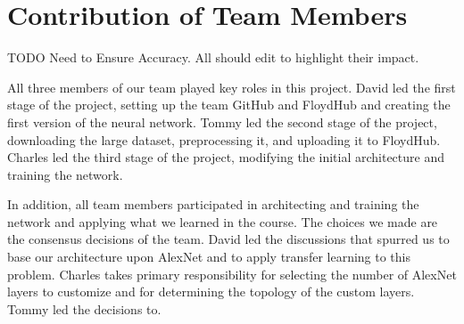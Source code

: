 \section{Contribution of Team Members}

TODO Need to Ensure Accuracy. All should edit to highlight their impact.

All three members of our team played key roles in this project. David led the first stage of the project, setting up the team GitHub and FloydHub and creating the first version of the neural network. Tommy led the second stage of the project, downloading the large dataset, preprocessing it, and uploading it to FloydHub. Charles led the third stage of the project, modifying the initial architecture and training the network.

In addition, all team members participated in architecting and training the network and applying what we learned in the course. The choices we made are the consensus decisions of the team. David led the discussions that spurred us to base our architecture upon AlexNet and to apply transfer learning to this problem. Charles takes primary responsibility for selecting the number of AlexNet layers to customize and for determining the topology of the custom layers. Tommy led the decisions to.